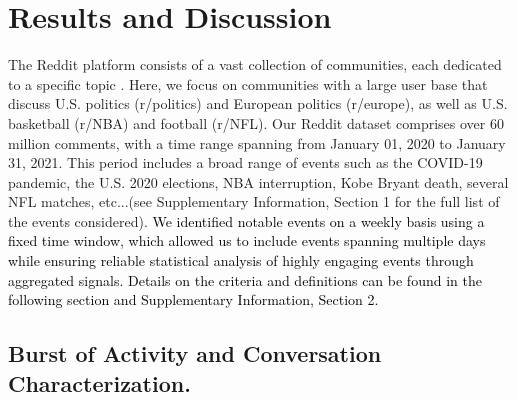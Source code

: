 \documentclass[fleqn,10pt]{wlscirep}
\newcommand{\new}[1]{\textcolor{black}{#1}}
\begin{document}
\section*{Results and Discussion}

The Reddit platform consists of a vast collection of communities, each dedicated to a specific topic \cite{olson2015navigating}.
Here, we focus on communities with a large user base that discuss U.S. politics (r/politics) and European politics (r/europe), as well as U.S. basketball (r/NBA) and football (r/NFL). 
Our Reddit dataset comprises over 60 million comments, with a time range spanning from January 01, 2020 to January 31, 2021. 
This period includes a broad range of events such as the COVID-19 pandemic, the U.S. 2020 elections, NBA interruption, Kobe Bryant death, several NFL matches, etc...(see Supplementary Information, Section 1 for the full list of the events considered).
\new{
We identified notable events on a weekly basis using a fixed time window, which allowed us to include events spanning multiple days while ensuring reliable statistical analysis of highly engaging events through aggregated signals.
Details on the criteria and definitions can be found in the following section and Supplementary Information, Section 2.
}
%
\subsection*{Burst of Activity and Conversation Characterization.}
\end{document}

